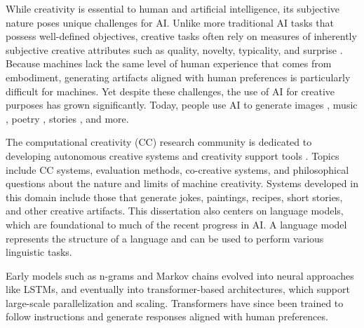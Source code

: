 \documentclass[phd,electronic,oneside,twosidetoc,letterpaper,chaptercenter,parttop,lof]{byumsphd}
\begin{document}
While creativity is essential to human and artificial intelligence, its subjective nature poses unique challenges for AI.
Unlike more traditional AI tasks that possess well-defined objectives, creative tasks often rely on measures of inherently subjective creative attributes such as quality, novelty, typicality, and surprise \cite{ritchie07,pease2011face,jordanous2012standardised,bown2014,lamb2015,ventura2016mere,carnovalini2021,peeperkorn2023}. 
Because machines lack the same level of human experience that comes from embodiment, generating artifacts aligned with human preferences is particularly difficult for machines. 
Yet despite these challenges, the use of AI for creative purposes has grown significantly. 
Today, people use AI to generate images \cite{ho2020denoising}, music \cite{Agostinelli2023MusicLMGM}, poetry \cite{Ormazabal2022PoeLMAM}, stories \cite{Fan2018HierarchicalNS}, and more.

The computational creativity (CC) research community is dedicated to developing autonomous creative systems and creativity support tools \cite{ventura2017howto}.
Topics include CC systems, evaluation methods, co-creative systems, and philosophical questions about the nature and limits of machine creativity.
Systems developed in this domain include those that generate jokes, paintings, recipes, short stories, and other creative artifacts.
This dissertation also centers on language models, which are foundational to much of the recent progress in AI.
A language model represents the structure of a language and can be used to perform various linguistic tasks.


Early models such as n-grams and Markov chains evolved into neural approaches like LSTMs, and eventually into transformer-based architectures, which support large-scale parallelization and scaling.
Transformers have since been trained to follow instructions and generate responses aligned with human preferences. 
\end{document}
